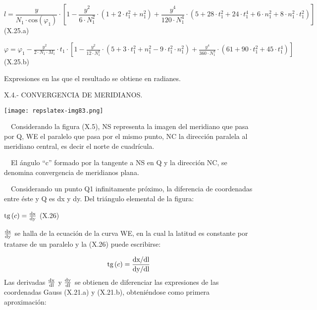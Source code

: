 \documentclass{tufte-book}
\newcommand\normalsubformula[1]{\text{\mathversion{normal}$#1$}}
\begin{document}
\begin{equation*}
{l=\frac{y}{N_{{1}}\cdot \text{cos}\left(\varphi _{{1}}\right)}\cdot
\left[1-\frac{y^{{2}}}{6\cdot N_{{1}}^{{2}}}\cdot \left(1+2\cdot
t_{{1}}^{{2}}+n_{{1}}^{{2}}\right)+\frac{y^{{4}}}{\text{120}\cdot
N_{{1}}^{{4}}}\cdot \left(5+\text{28}\cdot t_{{1}}^{{2}}+\text{24}\cdot
t_{{1}}^{{4}}+6\cdot n_{{1}}^{{2}}+8\cdot n_{{1}}^{{2}}\cdot
t_{{1}}^{{2}}\right)\right]}
\end{equation*}
(X.25.a)

 ${\varphi =\varphi _{{1}}-\frac{y^{{2}}}{2\cdot N_{{1}}\cdot
M_{{1}}}\cdot t_{{1}}\cdot \left[1-\frac{y^{{2}}}{\text{12}\cdot
N_{{1}}^{{2}}}\cdot \left(5+3\cdot t_{{1}}^{{2}}+n_{{1}}^{{2}}-9\cdot
t_{{1}}^{{2}}\cdot n_{{1}}^{{2}}\right)+\frac{y^{{4}}}{\text{360}\cdot
N_{{1}}^{{4}}}\cdot \left(\text{61}+\text{90}\cdot
t_{{1}}^{{2}}+\text{45}\cdot t_{{1}}^{{4}}\right)\right]}$(X.25.b)

Expresiones en las que el resultado se obtiene en radianes.

X.4.- CONVERGENCIA DE MERIDIANOS.

\begin{marginfigure}
\texttt{[image: repslatex-img83.png]}
\end{marginfigure}
 

\ \ Considerando la figura (X.5), NS representa la imagen del meridiano
que pasa por Q, WE el paralelo que pasa por el mismo punto, NC la
dirección paralela al meridiano central, es decir el norte de
cuadrícula.

\ \ El ángulo {\textquotedblleft}c{\textquotedblright} formado por la
tangente a NS en Q y la dirección NC, se denomina convergencia de
meridianos plana.

\ \ Considerando un punto Q1 infinitamente próximo, la diferencia de
coordenadas entre éste y Q es dx y dy. Del triángulo elemental de
la figura:


${\normalsubformula{\text{tg}}\left(c\right)=\frac{\normalsubformula{\text{dx}}}{\normalsubformula{\text{dy}}}}$
 (X.26)

 ${\frac{\normalsubformula{\text{dx}}}{\normalsubformula{\text{dy}}}}$
se halla de la ecuación de la curva WE, en la cual la latitud es
constante por tratarse de un paralelo y la (X.26) puede escribirse:

\begin{equation*}
{\normalsubformula{\text{tg}}\left(c\right)=\frac{\normalsubformula{\text{dx}}/\normalsubformula{\text{dl}}}{\normalsubformula{\text{dy}}/\normalsubformula{\text{dl}}}}
\end{equation*}
Las derivadas 
${\frac{\normalsubformula{\text{dx}}}{\normalsubformula{\text{dl}}}}$ y
 ${\frac{\normalsubformula{\text{dy}}}{\normalsubformula{\text{dl}}}}$
se obtienen de diferenciar las expresiones de las coordenadas Gauss
(X.21.a) y (X.21.b), obteniéndose como primera aproximación:
\end{document}
